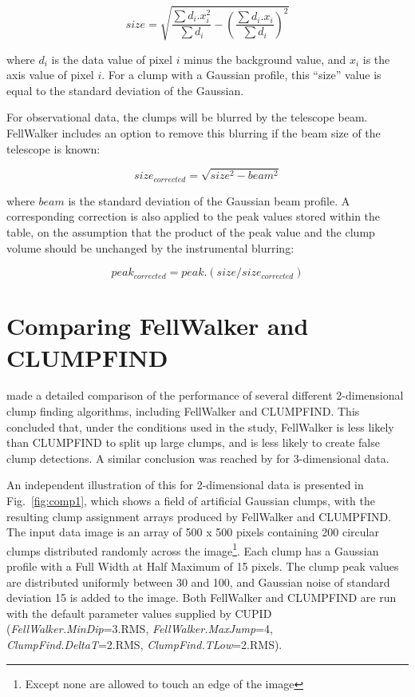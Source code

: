 \documentclass[final,authoryear,5p,times,twocolumn]{elsarticle}
\begin{document}
\[ size = \sqrt{ \frac{ \sum d_{i}.x_{i}^{2} }{ \sum d_{i} } -
\left( \frac{\sum d_{i}.x_{i} }{\sum d_{i}}  \right)^2 } \]

where $d_{i}$ is the data value of pixel $i$ minus the background value,
and $x_{i}$ is the axis value of pixel $i$. For a clump with a Gaussian
profile, this ``size'' value is equal to the standard deviation of the
Gaussian.

For observational data, the clumps will be blurred by the telescope beam.
FellWalker includes an option to remove this blurring if the beam size of
the telescope is known:

\[ size_{corrected} = \sqrt{ size^{2} - beam^{2} } \]

where $beam$ is the standard deviation of the Gaussian beam profile. A
corresponding correction is also applied to the peak values stored within
the table, on the assumption that the product of the peak value and the
clump volume should be unchanged by the instrumental blurring:

\[ peak_{corrected} = peak.(size/size_{corrected}) \]




\section{Comparing FellWalker and CLUMPFIND}

\cite{2010Watson} made a detailed comparison of the performance of several
different 2-dimensional clump finding algorithms, including FellWalker and CLUMPFIND.
This concluded that, under the conditions used in the study, FellWalker
is less likely than CLUMPFIND to split up large clumps, and is less
likely to create false clump detections. A similar conclusion was reached
by \cite{2014Christie} for 3-dimensional data.

An independent illustration of this for 2-dimensional data is presented in
Fig.~\ref{fig:comp1}, which shows a field of artificial Gaussian clumps,
with the resulting clump assignment arrays produced by FellWalker and
CLUMPFIND. The input data image is an array of 500 x 500 pixels
containing 200 circular clumps distributed randomly across the
image\footnote{Except none are allowed to touch an edge of the image}.
Each clump has a Gaussian profile with a Full Width at Half Maximum of 15
pixels. The clump peak values are distributed uniformly between 30 and
100, and Gaussian noise of standard deviation 15 is added to the image.
Both FellWalker and CLUMPFIND are run with the default parameter values
supplied by CUPID (\emph{FellWalker.MinDip}=3.RMS,
\emph{FellWalker.MaxJump}=4, \emph{ClumpFind.DeltaT}=2.RMS,
\emph{ClumpFind.TLow}=2.RMS).
\end{document}

